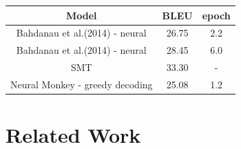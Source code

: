 \begin{table}[h!]
\centering
 \begin{tabular}{ |c|c|c| } 
  \hline Model & BLEU & epoch \\ 
  \hline  Bahdanau et al.(2014) - neural & 26.75 & 2.2\\
  Bahdanau et al.(2014) - neural & 28.45 & 6.0\\
  SMT & 33.30 & -\\
  \hline Neural Monkey - greedy decoding & 25.08 & 1.2\\
  \hline
 \end{tabular}

\end{table}


\section{Related Work}
